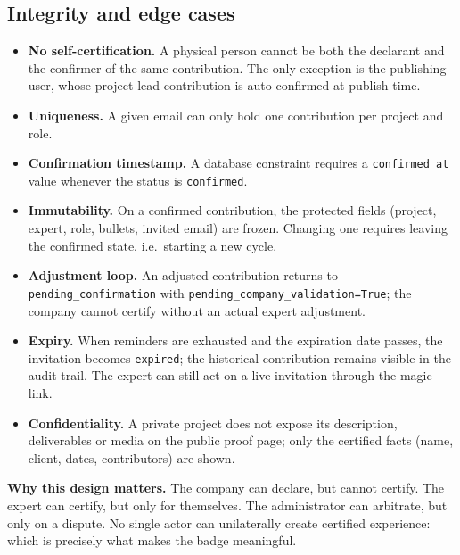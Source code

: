 \documentclass[11pt,a4paper]{article}
\begin{document}
\subsection{Integrity and edge cases}

\begin{itemize}[leftmargin=1.4em,itemsep=3pt]
  \item \textbf{No self-certification.} A physical person cannot be both the
        declarant and the confirmer of the same contribution. The only
        exception is the publishing user, whose project-lead contribution is
        auto-confirmed at publish time.
  \item \textbf{Uniqueness.} A given email can only hold one contribution per
        project and role.
  \item \textbf{Confirmation timestamp.} A database constraint requires a
        \texttt{confirmed\_at} value whenever the status is \texttt{confirmed}.
  \item \textbf{Immutability.} On a confirmed contribution, the protected
        fields (project, expert, role, bullets, invited email) are frozen.
        Changing one requires leaving the confirmed state, i.e.\ starting a new
        cycle.
  \item \textbf{Adjustment loop.} An adjusted contribution returns to
        \texttt{pending\_confirmation} with
        \texttt{pending\_company\_validation=True}; the company cannot certify
        without an actual expert adjustment.
  \item \textbf{Expiry.} When reminders are exhausted and the expiration date
        passes, the invitation becomes \texttt{expired}; the historical
        contribution remains visible in the audit trail. The expert can still
        act on a live invitation through the magic link.
  \item \textbf{Confidentiality.} A private project does not expose its
        description, deliverables or media on the public proof page; only the
        certified facts (name, client, dates, contributors) are shown.
\end{itemize}

\begin{accentbox}
\textbf{Why this design matters.} The company can declare, but cannot certify.
The expert can certify, but only for themselves. The administrator can
arbitrate, but only on a dispute. No single actor can unilaterally create
certified experience: which is precisely what makes the badge meaningful.
\end{accentbox}
\end{document}
